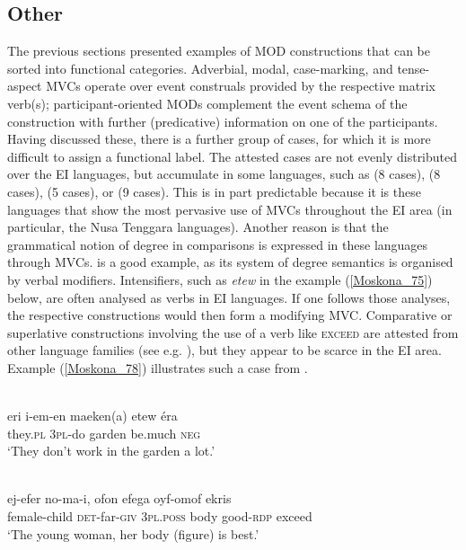 \subsection{Other}

The previous sections presented examples of MOD constructions that can be sorted into functional categories. Adverbial, modal, case-marking, and tense-aspect MVCs operate over event construals provided by the respective matrix verb(s); participant-oriented MODs complement the event schema of the construction with further (predicative) information on one of the participants. Having discussed these, there is a further group of cases, for which it is more difficult to assign a functional label. The attested cases are not evenly distributed over the EI languages, but accumulate in some languages, such as  (8 cases),  (8 cases),  (5 cases), or  (9 cases). This is in part predictable because it is these languages that show the most pervasive use of MVCs throughout the EI area (in particular, the Nusa Tenggara languages). Another reason is that the grammatical notion of degree in comparisons is expressed in these languages through MVCs.  is a good example, as its system of degree semantics is organised by verbal modifiers. Intensifiers, such as \textit{etew} in the  example (\ref{Moskona_75}) below, are often analysed as verbs in EI languages. If one follows those analyses, the respective constructions would then form a modifying MVC. Comparative or superlative constructions involving the use of a verb like \textsc{exceed} are attested from other language families (see e.g. \citealt{Aikhenvald2006}), but they appear to be scarce in the EI area. Example (\ref{Moskona_78}) illustrates such a case from .

\ea \label{Moskona_75}
\\
\gll eri i-em-en maeken(a) etew éra \\
they.\textsc{pl} 3\textsc{pl}-do garden be.much \textsc{neg} \\
\glft `They don’t work in the garden a lot.’ \\ 
\z

\ea \label{Moskona_78}
\\
\gll ej-efer no-ma-i, ofon efega oyf-omof ekris \\
female-child \textsc{det}-far-\textsc{giv} 3\textsc{pl}.\textsc{poss} body good-\textsc{rdp} exceed \\
\glft `The young woman, her body (figure) is best.'\\ 
\z

